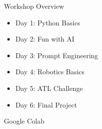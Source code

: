 \begin{frame}{Workshop Overview}
    \begin{itemize}
      \item Day 1: Python Basics
      \item Day 2: Fun with AI
      \item Day 3: Prompt Engineering
      \item Day 4: Robotics Basics
      \item Day 5: ATL Challenge
      \item Day 6: Final Project
    \end{itemize}
    
    \vspace{0.5cm}
     Google Colab
  \end{frame}